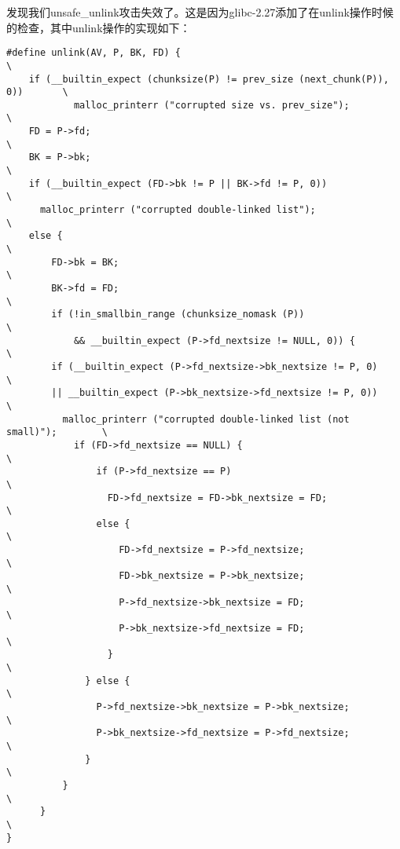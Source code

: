 发现我们unsafe\_unlink攻击失效了。这是因为glibc-2.27添加了在unlink操作时候的检查，其中unlink操作的实现如下：
\begin{verbatim}
#define unlink(AV, P, BK, FD) {                                                \
    if (__builtin_expect (chunksize(P) != prev_size (next_chunk(P)), 0))       \
            malloc_printerr ("corrupted size vs. prev_size");                  \
    FD = P->fd;                                                                \
    BK = P->bk;                                                                \
    if (__builtin_expect (FD->bk != P || BK->fd != P, 0))                      \
      malloc_printerr ("corrupted double-linked list");                        \
    else {                                                                     \
        FD->bk = BK;                                                           \
        BK->fd = FD;                                                           \
        if (!in_smallbin_range (chunksize_nomask (P))                          \
            && __builtin_expect (P->fd_nextsize != NULL, 0)) {                 \
        if (__builtin_expect (P->fd_nextsize->bk_nextsize != P, 0)             \
        || __builtin_expect (P->bk_nextsize->fd_nextsize != P, 0))             \
          malloc_printerr ("corrupted double-linked list (not small)");        \
            if (FD->fd_nextsize == NULL) {                                     \
                if (P->fd_nextsize == P)                                       \
                  FD->fd_nextsize = FD->bk_nextsize = FD;                      \
                else {                                                         \
                    FD->fd_nextsize = P->fd_nextsize;                          \
                    FD->bk_nextsize = P->bk_nextsize;                          \
                    P->fd_nextsize->bk_nextsize = FD;                          \
                    P->bk_nextsize->fd_nextsize = FD;                          \
                  }                                                            \
              } else {                                                         \
                P->fd_nextsize->bk_nextsize = P->bk_nextsize;                  \
                P->bk_nextsize->fd_nextsize = P->fd_nextsize;                  \
              }                                                                \
          }                                                                    \
      }                                                                        \
}
\end{verbatim}

